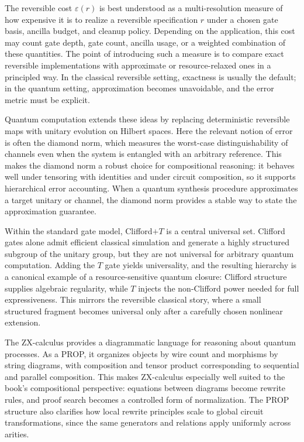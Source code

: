 \documentclass[11pt]{article}
\begin{document}
The reversible cost \(\varepsilon(r)\) is best understood as a multi-resolution measure of how expensive it is to realize a reversible specification \(r\) under a chosen gate basis, ancilla budget, and cleanup policy. Depending on the application, this cost may count gate depth, gate count, ancilla usage, or a weighted combination of these quantities. The point of introducing such a measure is to compare exact reversible implementations with approximate or resource-relaxed ones in a principled way. In the classical reversible setting, exactness is usually the default; in the quantum setting, approximation becomes unavoidable, and the error metric must be explicit.

Quantum computation extends these ideas by replacing deterministic reversible maps with unitary evolution on Hilbert spaces. Here the relevant notion of error is often the diamond norm, which measures the worst-case distinguishability of channels even when the system is entangled with an arbitrary reference. This makes the diamond norm a robust choice for compositional reasoning: it behaves well under tensoring with identities and under circuit composition, so it supports hierarchical error accounting. When a quantum synthesis procedure approximates a target unitary or channel, the diamond norm provides a stable way to state the approximation guarantee.

Within the standard gate model, Clifford\(+T\) is a central universal set. Clifford gates alone admit efficient classical simulation and generate a highly structured subgroup of the unitary group, but they are not universal for arbitrary quantum computation. Adding the \(T\) gate yields universality, and the resulting hierarchy is a canonical example of a resource-sensitive quantum closure: Clifford structure supplies algebraic regularity, while \(T\) injects the non-Clifford power needed for full expressiveness. This mirrors the reversible classical story, where a small structured fragment becomes universal only after a carefully chosen nonlinear extension.

The ZX-calculus provides a diagrammatic language for reasoning about quantum processes. As a PROP, it organizes objects by wire count and morphisms by string diagrams, with composition and tensor product corresponding to sequential and parallel composition. This makes ZX-calculus especially well suited to the book's compositional perspective: equations between diagrams become rewrite rules, and proof search becomes a controlled form of normalization. The PROP structure also clarifies how local rewrite principles scale to global circuit transformations, since the same generators and relations apply uniformly across arities.
\end{document}
